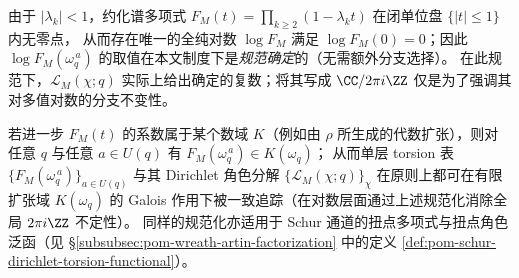 \begin{remark}[对数分支的规范化与代数可核验性]\label{rem:finite-part-torsion-log-branch-normalization}
由于 \(|\lambda_k|<1\)，约化谱多项式 \(F_M(t)=\prod_{k\ge2}(1-\lambda_k t)\) 在闭单位盘 \(\{|t|\le1\}\) 内无零点，
从而存在唯一的全纯对数 \(\log F_M\) 满足 \(\log F_M(0)=0\)；因此 \(\log F_M(\omega_q^{\,a})\) 的取值在本文制度下是\emph{规范确定}的（无需额外分支选择）。
在此规范下，\(\mathcal{L}_M(\chi;q)\) 实际上给出确定的复数；将其写成 \(\CC/2\pi i\ZZ\) 仅是为了强调其对多值对数的分支不变性。
\par
若进一步 \(F_M(t)\) 的系数属于某个数域 \(K\)（例如由 \(\rho\) 所生成的代数扩张），则对任意 \(q\) 与任意 \(a\in U(q)\) 有
\(
F_M(\omega_q^{\,a})\in K(\omega_q)
\)；
从而单层 torsion 表 \(\{F_M(\omega_q^{\,a})\}_{a\in U(q)}\) 与其 Dirichlet 角色分解
\(\{\mathcal{L}_M(\chi;q)\}_\chi\)
在原则上都可在有限扩张域 \(K(\omega_q)\) 的 Galois 作用下被一致追踪（在对数层面通过上述规范化消除全局 \(2\pi i\ZZ\) 不定性）。
同样的规范化亦适用于 Schur 通道的扭点多项式与扭点角色泛函（见 \S\ref{subsubsec:pom-wreath-artin-factorization} 中的定义 \ref{def:pom-schur-dirichlet-torsion-functional}）。
\end{remark}
